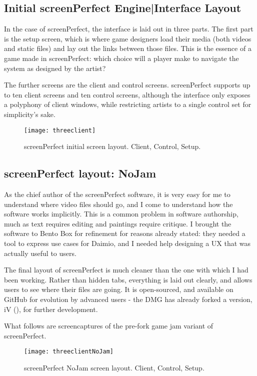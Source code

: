 \subsection{Initial screenPerfect Engine|Interface Layout}
In the case of screenPerfect, the interface is laid out in three parts. The first part is the setup screen, which is where game designers load their media (both videos and static files) and lay out the links between those files. This is the essence of a game made in screenPerfect: which choice will a player make to navigate the system as designed by the artist?

The further screens are the client and control screens. screenPerfect supports up to ten client screens and ten control screens, although the interface only exposes a polyphony of client windows, while restricting artists to a single control set for simplicity's sake.

\begin{figure}[h]
  \caption{screenPerfect initial screen layout. Client, Control, Setup.}
  \centering
    \texttt{[image: threeclient]}
\end{figure}

\subsection{screenPerfect layout: NoJam}

As the chief author of the screenPerfect software, it is very easy for me to understand where video files should go, and I come to understand how the software works implicitly. This is a common problem in software authorship, much as text requires editing and paintings require critique. I brought the software to Bento Box for refinement for reasons already stated: they needed a tool to express use cases for Daimio, and I needed help designing a UX that was actually useful to users.

The final layout of screenPerfect is much cleaner than the one with which I had been working. Rather than hidden tabs, everything is laid out clearly, and allows users to see where their files are going. It is open-sourced, and available on GitHub for evolution by advanced users - the DMG has already forked a version, iV (\cite{daimio}), for further development.

What follows are screencaptures of the pre-fork game jam variant of screenPerfect.

\begin{figure}[h]
  \caption{screenPerfect NoJam screen layout. Client, Control, Setup.}
  \centering
    \texttt{[image: threeclientNoJam]}
\end{figure}

